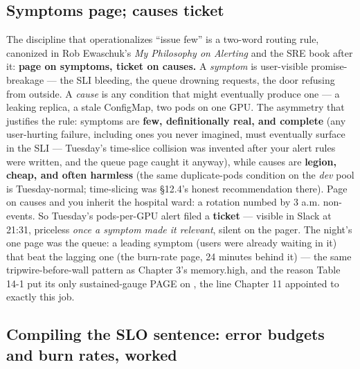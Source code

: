 \subsection*{Symptoms page; causes ticket}

The discipline that operationalizes “issue few” is a two-word routing rule, canonized in Rob Ewaschuk’s \textit{My Philosophy on Alerting} and the SRE book after it: \textbf{page on symptoms, ticket on causes.} A \textit{symptom} is user-visible promise-breakage — the SLI bleeding, the queue drowning requests, the door refusing from outside. A \textit{cause} is any condition that might eventually produce one — a leaking replica, a stale ConfigMap, two pods on one GPU. The asymmetry that justifies the rule: symptoms are \textbf{few, definitionally real, and complete} (any user-hurting failure, including ones you never imagined, must eventually surface in the SLI — Tuesday’s time-slice collision was invented after your alert rules were written, and the queue page caught it anyway), while causes are \textbf{legion, cheap, and often harmless} (the same duplicate-pods condition on the \textit{dev} pool is Tuesday-normal; time-slicing was §12.4’s honest recommendation there). Page on causes and you inherit the hospital ward: a rotation numbed by 3 a.m. non-events. So Tuesday’s pods-per-GPU alert filed a \textbf{ticket} — visible in Slack at 21:31, priceless \textit{once a symptom made it relevant}, silent on the pager. The night’s one page was the queue: a leading symptom (users were already waiting in it) that beat the lagging one (the burn-rate page, 24 minutes behind it) — the same tripwire-before-wall pattern as Chapter 3’s memory.high, and the reason Table 14-1 put its only sustained-gauge PAGE on , the line Chapter 11 appointed to exactly this job.

\subsection*{Compiling the SLO sentence: error budgets and burn rates, worked}


